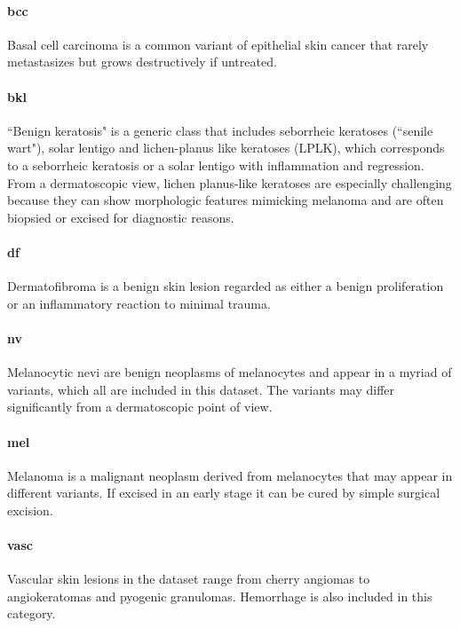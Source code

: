 	\paragraph{bcc}
	Basal cell carcinoma is a common variant of epithelial skin cancer that rarely metastasizes but grows destructively if untreated. 
	
	\paragraph{bkl}
	``Benign keratosis" is a generic class that includes seborrheic keratoses (``senile wart"), solar lentigo and lichen-planus like keratoses (LPLK), which corresponds to a seborrheic keratosis or a solar lentigo with inflammation and regression. From a dermatoscopic view, lichen planus-like keratoses are especially challenging because they can show morphologic features mimicking melanoma and are often biopsied or excised for diagnostic reasons. 
	
	\paragraph{df}
	Dermatofibroma is a benign skin lesion regarded as either a benign proliferation or an inflammatory reaction to minimal trauma. 
	
	\paragraph{nv}
	Melanocytic nevi are benign neoplasms of melanocytes and appear in a myriad of variants, which all are included in this dataset. The variants may differ significantly from a dermatoscopic point of view.
	
	\paragraph{mel}
	Melanoma is a malignant neoplasm derived from melanocytes that may appear in different variants. If excised in an early stage it can be cured by simple surgical excision. 
	
	\paragraph{vasc}
	Vascular skin lesions in the dataset range from cherry angiomas to angiokeratomas and pyogenic granulomas. Hemorrhage is also included in this category.
	
	\bigskip
	
